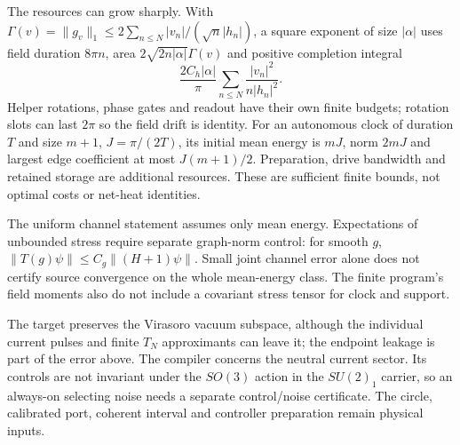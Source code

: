 The resources can grow sharply. With
$\Gamma(v)=\|g_v\|_1\leq2\sum_{n\leq N}|v_n|/(\sqrt n|h_n|)$,
a square exponent of size $|\alpha|$ uses field duration $8\pi n$,
area $2\sqrt{2n|\alpha|}\Gamma(v)$ and positive completion integral
\[
 \frac{2C_h|\alpha|}{\pi}
                  \sum_{n\leq N}\frac{|v_n|^2}{n|h_n|^2}.
\]
Helper rotations, phase gates and readout have their own finite
budgets; rotation slots can last $2\pi$ so the field drift is identity.
For an autonomous clock of duration $T$ and size $m+1$,
$J=\pi/(2T)$, its initial mean energy is $mJ$, norm $2mJ$ and
largest edge coefficient at most $J(m+1)/2$.
Preparation, drive bandwidth and retained storage are additional
resources. These are sufficient finite bounds, not optimal costs or
net-heat identities.

The uniform channel statement assumes only mean energy.
Expectations of unbounded stress require separate graph-norm control:
for smooth $g$, $\|T(g)\psi\|\leq C_g\|(H+1)\psi\|$.
Small joint channel error alone does not certify source convergence
on the whole mean-energy class. The finite program's field moments
also do not include a covariant stress tensor for clock and support.

The target preserves the Virasoro vacuum subspace, although the
individual current pulses and finite $T_N$ approximants can leave it;
the endpoint leakage is part of the error above.
The compiler concerns the neutral current sector. Its controls are
not invariant under the $SO(3)$ action in the $SU(2)_1$ carrier, so
an always-on selecting noise needs a separate control/noise
certificate. The circle, calibrated port, coherent interval and
controller preparation remain physical inputs.

